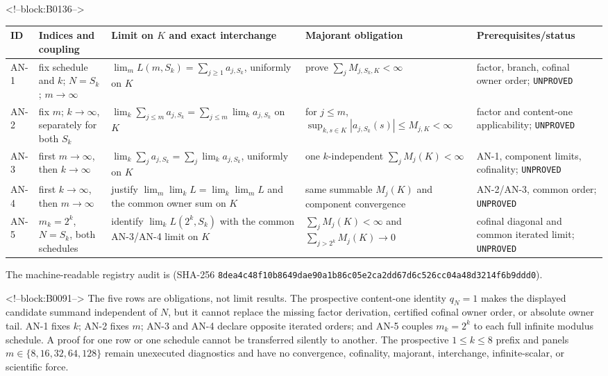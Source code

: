 \documentclass[11pt]{article}
\begin{document}
<!--block:B0136-->
\begin{center}
\scriptsize
\begin{tabular}{@{}p{.06\linewidth}p{.17\linewidth}p{.25\linewidth}p{.23\linewidth}p{.17\linewidth}@{}}
\toprule
ID & Indices and coupling & Limit on \(K\) and exact interchange & Majorant obligation & Prerequisites/status \\
\midrule
AN-1 & fix schedule and \(k\); \(N=S_k\); \(m\to\infty\) & \(\lim_m L(m,S_k)=\sum_{j\geq1}a_{j,S_k}\), uniformly on \(K\) & prove \(\sum_jM_{j,S_k,K}<\infty\) & factor, branch, cofinal owner order; \texttt{UNPROVED} \\
AN-2 & fix \(m\); \(k\to\infty\), separately for both \(S_k\) & \(\lim_k\sum_{j\leq m}a_{j,S_k}=\sum_{j\leq m}\lim_ka_{j,S_k}\) on \(K\) & for \(j\leq m\), \(\sup_{k,s\in K}|a_{j,S_k}(s)|\leq M_{j,K}<\infty\) & factor and content-one applicability; \texttt{UNPROVED} \\
AN-3 & first \(m\to\infty\), then \(k\to\infty\) & \(\lim_k\sum_ja_{j,S_k}=\sum_j\lim_ka_{j,S_k}\), uniformly on \(K\) & one \(k\)-independent \(\sum_jM_j(K)<\infty\) & AN-1, component limits, cofinality; \texttt{UNPROVED} \\
AN-4 & first \(k\to\infty\), then \(m\to\infty\) & justify \(\lim_m\lim_kL=\lim_k\lim_mL\) and the common owner sum on \(K\) & same summable \(M_j(K)\) and component convergence & AN-2/AN-3, common order; \texttt{UNPROVED} \\
AN-5 & \(m_k=2^k\), \(N=S_k\), both schedules & identify \(\lim_kL(2^k,S_k)\) with the common AN-3/AN-4 limit on \(K\) & \(\sum_jM_j(K)<\infty\) and \(\sum_{j>2^k}M_j(K)\to0\) & cofinal diagonal and common iterated limit; \texttt{UNPROVED} \\
\bottomrule
\end{tabular}
\end{center}
\begingroup\sloppy
The machine-readable registry audit is
 (SHA-256
\texttt{8dea4c48\allowbreak{}f10b8649\allowbreak{}dae90a1b\allowbreak{}86c05e2c\allowbreak{}a2dd67d6\allowbreak{}c526cc04\allowbreak{}a48d3214\allowbreak{}f6b9ddd0}).
\par\endgroup

<!--block:B0091-->
The five rows are obligations, not limit results.  The prospective
content-one identity \(q_N=1\) makes the displayed candidate summand independent
of \(N\), but it cannot replace the missing factor derivation, certified cofinal
owner order, or absolute owner tail.  AN-1 fixes \(k\); AN-2 fixes \(m\);
AN-3 and AN-4 declare opposite iterated orders; and AN-5 couples
\(m_k=2^k\) to each full infinite modulus schedule.  A proof for one row or one
schedule cannot be transferred silently to another.  The prospective
\(1\leq k\leq8\) prefix and panels
\(m\in\{8,16,32,64,128\}\) remain unexecuted diagnostics and have no
convergence, cofinality, majorant, interchange, infinite-scalar, or scientific
force.
\end{document}
